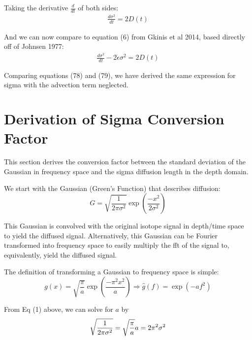 \documentclass[draft, jgrga]{AGUTeX}
\begin{document}
\begin{article}
Taking the derivative \begin{math} \frac{d}{dt} \end{math} of both sides:
\begin{eqnarray}
\frac{d\sigma^2}{dt} = 2 D(t)
\end{eqnarray}

And we can now compare to equation (6) from Gkinis et al 2014, based directly off of Johnsen 1977:
\begin{eqnarray}
\frac{d\sigma^2}{dt} - 2 \dot{\epsilon} \sigma ^2 = 2D(t)
\end{eqnarray}

Comparing equations (78) and (79), we have derived the same expression for sigma with the
advection term neglected.

\section{Derivation of Sigma Conversion Factor}

This section derives the conversion factor between the standard deviation of the Gaussian in frequency space and the sigma diffusion length in the depth domain.

We start with the Gaussian (Green's Function) that describes diffusion:
\begin{equation}
  G = \sqrt{\frac{1}{2\pi\sigma^{2}}} \exp\left(\frac{-x^{2}}{2\sigma^{2}}\right)
\end{equation}

This Gaussian is convolved with the original isotope signal in depth/time space to yield the diffused signal. Alternatively, this Gaussian can be Fourier transformed into frequency space to easily multiply the fft of the signal to, equivalently, yield the diffused signal.

The definition of transforming a Gaussian to frequency space is simple:
\begin{equation}
  g(x) = \sqrt{\frac{\pi}{a}}\exp\left(\frac{-\pi^{2}x^{2}}{a}\right)
  \Rightarrow
  \hat{g}(f) = \exp\left(-af^{2}\right)
\end{equation}

From Eq (1) above, we can solve for $a$ by
\begin{equation}
  \sqrt{\frac{1}{2\pi\sigma^{2}}} = \sqrt{\frac{\pi}{a}} \\
  a = 2\pi^{2}\sigma^{2}
\end{equation}


\end{article}
\end{document}
